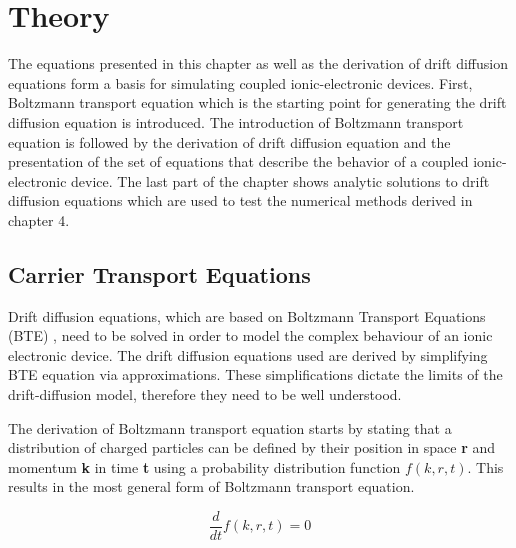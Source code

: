 
\chapter{Theory} %

\label{Chapter2} %

\begin{doublespace}

The equations presented in this chapter as well as the derivation of drift diffusion equations form a basis for simulating coupled ionic-electronic devices. First,  Boltzmann transport equation which is the starting point for generating the drift diffusion equation is introduced. The introduction of  Boltzmann transport equation is followed by the derivation of  drift diffusion equation and the presentation of the set of equations that describe the behavior of a coupled ionic-electronic device. The last part of the chapter shows analytic solutions to  drift diffusion equations which are used to test the numerical methods derived in chapter 4.   

\section{Carrier Transport Equations}
Drift diffusion equations, which are based on Boltzmann Transport Equations (BTE) \cite{Dragica1}, need to be solved in order to model the complex behaviour of an ionic electronic device. The drift diffusion equations used are derived by simplifying  BTE equation via approximations. These simplifications dictate the limits of the drift-diffusion model, therefore they need to be well understood.

The derivation of  Boltzmann transport equation starts by stating that a distribution of charged particles can be defined by their position in space \textbf{r} and momentum \textbf{k} in time \textbf{t} using a probability distribution function $f(k,r,t)$. This results in the most general form of  Boltzmann transport equation\cite{snowden}.

\begin{equation}
\frac{d }{dt}f(k,r,t)=0
\end{equation}


\end{doublespace}
